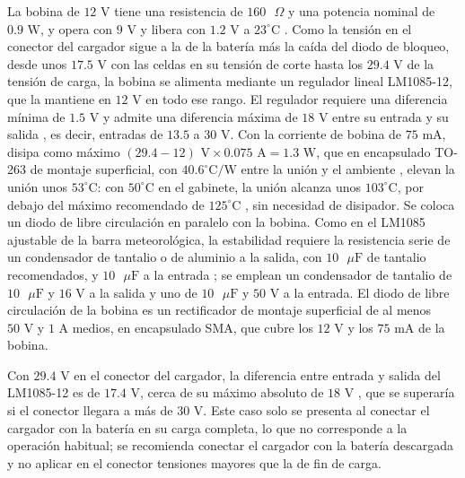 \documentclass[../../General.tex]{subfiles}
\begin{document}
La bobina de $12\text{ V}$ tiene una resistencia de $160\text{ }\Omega$ y una potencia nominal de $0.9\text{ W}$, y opera con $9\text{ V}$ y libera con $1.2\text{ V}$ a $23^\circ\text{C}$ \citep{te_t9g}. Como la tensión en el conector del cargador sigue a la de la batería más la caída del diodo de bloqueo, desde unos $17.5\text{ V}$ con las celdas en su tensión de corte hasta los $29.4\text{ V}$ de la tensión de carga, la bobina se alimenta mediante un regulador lineal LM1085-12, que la mantiene en $12\text{ V}$ en todo ese rango. El regulador requiere una diferencia mínima de $1.5\text{ V}$ y admite una diferencia máxima de $18\text{ V}$ entre su entrada y su salida \citep{ti_lm1085}, es decir, entradas de $13.5$ a $30\text{ V}$. Con la corriente de bobina de $75\text{ mA}$, disipa como máximo $(29.4 - 12)\text{ V} \times 0.075\text{ A} = 1.3\text{ W}$, que en encapsulado TO-263 de montaje superficial, con $40.6^\circ\text{C/W}$ entre la unión y el ambiente \citep{ti_lm1085}, elevan la unión unos $53^\circ\text{C}$: con $50^\circ\text{C}$ en el gabinete, la unión alcanza unos $103^\circ\text{C}$, por debajo del máximo recomendado de $125^\circ\text{C}$ \citep{ti_lm1085}, sin necesidad de disipador. Se coloca un diodo de libre circulación en paralelo con la bobina.
Como en el LM1085 ajustable de la barra meteorológica, la estabilidad requiere la resistencia serie de un condensador de tantalio o de aluminio a la salida, con $10\text{ }\mu\text{F}$ de tantalio recomendados, y $10\text{ }\mu\text{F}$ a la entrada \citep{ti_lm1085}; se emplean un condensador de tantalio de $10\text{ }\mu\text{F}$ y $16\text{ V}$ a la salida y uno de $10\text{ }\mu\text{F}$ y $50\text{ V}$ a la entrada.
El diodo de libre circulación de la bobina es un rectificador de montaje superficial de al menos $50\text{ V}$ y $1\text{ A}$ medios, en encapsulado SMA, que cubre los $12\text{ V}$ y los $75\text{ mA}$ de la bobina.

Con $29.4\text{ V}$ en el conector del cargador, la diferencia entre entrada y salida del LM1085-12 es de $17.4\text{ V}$, cerca de su máximo absoluto de $18\text{ V}$ \citep{ti_lm1085}, que se superaría si el conector llegara a más de $30\text{ V}$. Este caso solo se presenta al conectar el cargador con la batería en su carga completa, lo que no corresponde a la operación habitual; se recomienda conectar el cargador con la batería descargada y no aplicar en el conector tensiones mayores que la de fin de carga.
\end{document}
